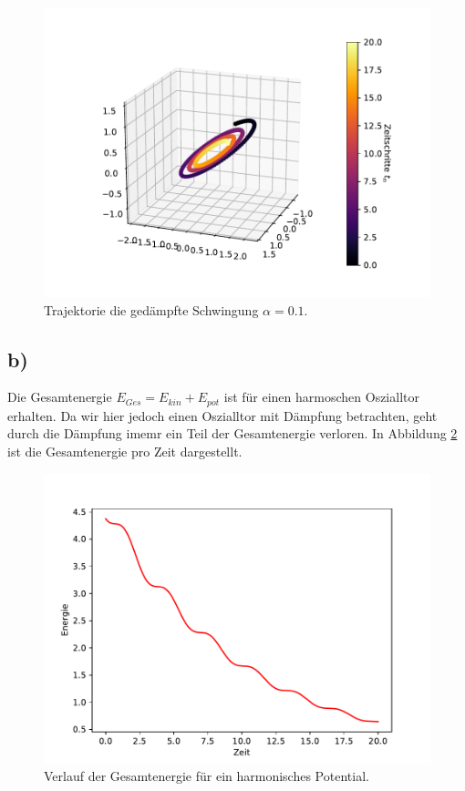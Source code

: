 \begin{figure}[H]
  \centering
  \includegraphics[scale=0.7]{A2/plots/aufg2_a4.pdf}
  \caption{Trajektorie die gedämpfte Schwingung $\alpha = 0.1$.}
  \label{fig:gedämpft}
\end{figure}

\subsection*{b)}
Die Gesamtenergie $E_{Ges} = E_{kin} + E_{pot}$ ist für einen harmoschen Oszialltor erhalten. Da wir hier jedoch einen Oszialltor mit Dämpfung betrachten, geht durch die Dämpfung imemr ein Teil der Gesamtenergie verloren.
In Abbildung \ref{fig:energie} ist die Gesamtenergie pro Zeit dargestellt.

\begin{figure}
  \centering
  \includegraphics[scale=0.7]{A2/plots/Energie.pdf}
  \caption{Verlauf der Gesamtenergie für ein harmonisches Potential.}
  \label{fig:energie}
\end{figure}

